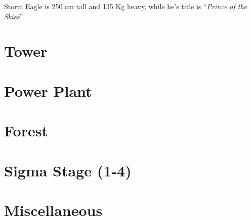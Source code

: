  Storm Eagle is 250 cm tall and 135 Kg heavy, while he's title is ``\textit{Prince of the Skies}''.
\section{Tower}
\section{Power Plant}
\section{Forest}
\section{Sigma Stage (1-4)}
\section{Miscellaneous}\label{X1:misc} %